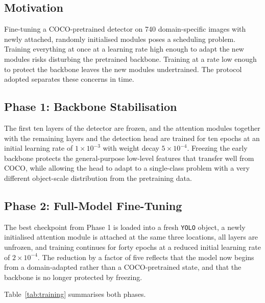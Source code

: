 \documentclass[MScCS]{uccthesis}
\begin{document}
\subsection{Motivation}

Fine-tuning a COCO-pretrained detector on 740 domain-specific images with newly
attached, randomly initialised modules poses a scheduling problem. Training
everything at once at a learning rate high enough to adapt the new modules
risks disturbing the pretrained backbone. Training at a rate low enough to
protect the backbone leaves the new modules undertrained. The protocol adopted
separates these concerns in time.

\subsection{Phase 1: Backbone Stabilisation}

The first ten layers of the detector are frozen, and the attention modules
together with the remaining layers and the detection head are trained for ten
epochs at an initial learning rate of $1 \times 10^{-3}$ with weight decay
$5 \times 10^{-4}$. Freezing the early backbone protects the general-purpose
low-level features that transfer well from COCO, while allowing the head to
adapt to a single-class problem with a very different object-scale distribution
from the pretraining data.

\subsection{Phase 2: Full-Model Fine-Tuning}

The best checkpoint from Phase 1 is loaded into a fresh \texttt{YOLO} object, a
newly initialised attention module is attached at the same three locations, all
layers are unfrozen, and training continues for forty epochs at a reduced
initial learning rate of $2 \times 10^{-4}$. The reduction by a factor of five
reflects that the model now begins from a domain-adapted rather than a
COCO-pretrained state, and that the backbone is no longer protected by
freezing.

Table~\ref{tab:training} summarises both phases.
\end{document}
